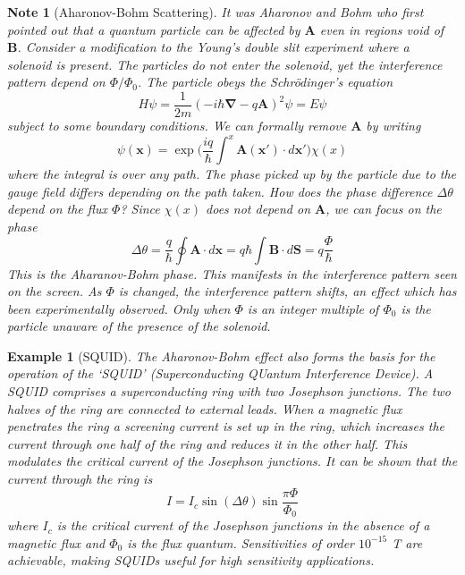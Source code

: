 \documentclass[a4paper]{article}
\newtheorem{eg}{Example}[section]
\newtheorem{Note}{Note}[section]
\theoremstyle{new}
\begin{document}
\begin{Note}[Aharonov-Bohm Scattering]
It was Aharonov and Bohm who first pointed out that a quantum particle can be affected by $\mathbf{A}$ even in regions void of $\mathbf{B}$. Consider a modification to the Young's double slit experiment where a solenoid is present. The particles do not enter the solenoid, yet the interference pattern depend on $\Phi/\Phi_0$. The particle obeys the Schr\"{o}dinger's equation
$$H\psi=\frac{1}{2m}(-i\hbar\boldsymbol{\nabla}-q\mathbf{A})^2\psi=E\psi$$
subject to some boundary conditions. We can formally remove $\mathbf{A}$ by writing 
$$\psi(\mathbf{x})=\exp\bigg(\frac{iq}{\hbar}\int^x\mathbf{A}(\mathbf{x'})\cdot d\mathbf{x'}\bigg)\chi(x)$$
where the integral is over any path. The phase picked up by the particle due to the gauge field differs depending on the path taken. How does the phase difference $\Delta\theta$ depend on the flux $\Phi$? Since $\chi(x)$ does not depend on $\mathbf{A}$, we can focus on the phase
$$\Delta\theta=\frac{q}{\hbar}\oint\mathbf{A}\cdot d\mathbf{x}=q\hbar\int\mathbf{B}\cdot d\mathbf{S}=q\frac{\Phi}{\hbar}$$
This is the Aharanov-Bohm phase. This manifests in the interference pattern seen on the screen. As $\Phi$ is changed, the interference pattern shifts, an effect which has been experimentally observed. Only when $\Phi$ is an integer multiple of $\Phi_0$ is the particle unaware of the presence of the solenoid.
\end{Note}
\begin{eg}[SQUID]
The Aharonov-Bohm effect also forms the basis for the operation of the `SQUID' (Superconducting QUantum Interference Device). A SQUID comprises a superconducting ring with two Josephson junctions. The two halves of the ring are connected to external leads. When a magnetic flux penetrates the ring a screening current is set up in the ring, which increases the current through one half of the ring and reduces it in the other half. This modulates the critical current of the Josephson junctions. It can be shown
that the current through the ring is 
$$I=I_c\sin(\Delta\theta)\sin\frac{\pi\Phi}{\Phi_0}$$
where $I_c$ is the critical current of the Josephson junctions in the absence of a magnetic flux and $\Phi_0$ is the flux quantum. Sensitivities of order $10^{−15}$ T are achievable, making SQUIDs useful for high sensitivity applications.
\end{eg}
\end{document}

